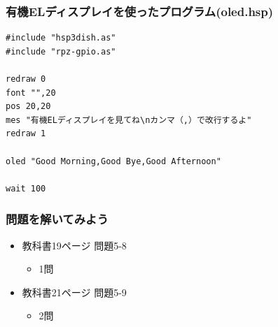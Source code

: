 \begin{frame}[fragile]
    \frametitle{有機ELディスプレイを使ったプログラム(oled.hsp)}
\begin{lstlisting}
#include "hsp3dish.as"
#include "rpz-gpio.as"

redraw 0
font "",20
pos 20,20
mes "有機ELディスプレイを見てね\nカンマ（,）で改行するよ"
redraw 1

oled "Good Morning,Good Bye,Good Afternoon"

wait 100
\end{lstlisting}
\end{frame}

\begin{frame}[fragile]
    \frametitle{問題を解いてみよう}
    \begin{itemize}
        \item 教科書19ページ 問題5-8
        \begin{itemize}
            \item 1問
        \end{itemize}
        \item 教科書21ページ 問題5-9
        \begin{itemize}
            \item 2問
        \end{itemize}
    \end{itemize}
\end{frame}